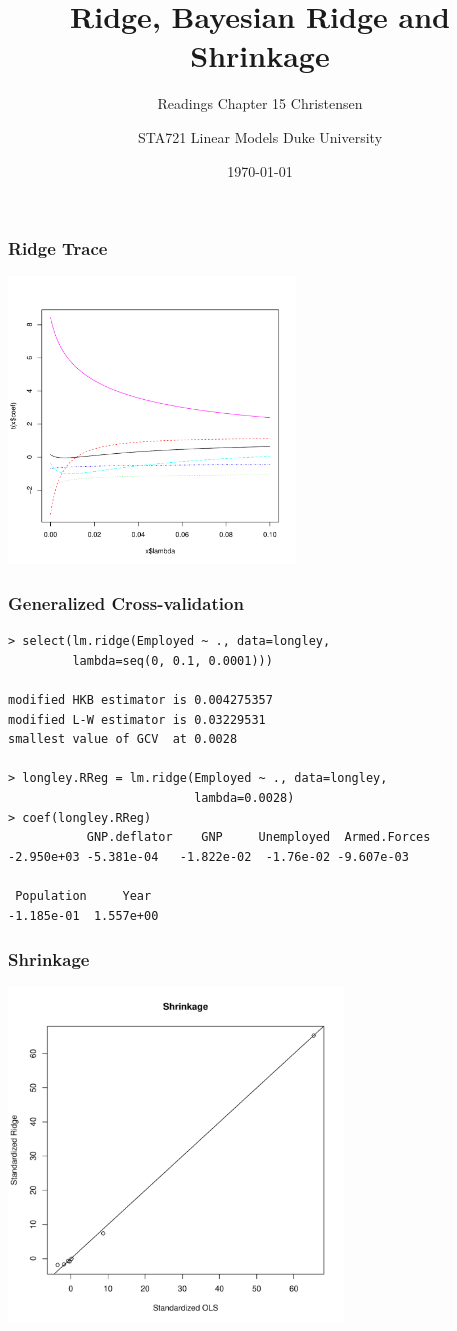 \documentclass[handout]{beamer}
\title{Ridge, Bayesian Ridge and Shrinkage}
\subtitle{Readings Chapter 15 Christensen}
\institute{Merlise Clyde}
\author{STA721 Linear Models Duke University}
\date{\today}
\begin{document}
\maketitle
\begin{frame}
  \frametitle{Ridge Trace}
  \centerline{\includegraphics[height=3in]{ridge-trace}}
\end{frame}
\begin{frame}[fragile]
\frametitle{Generalized Cross-validation}
\begin{small}
\begin{verbatim}
> select(lm.ridge(Employed ~ ., data=longley, 
         lambda=seq(0, 0.1, 0.0001)))

modified HKB estimator is 0.004275357 
modified L-W estimator is 0.03229531 
smallest value of GCV  at 0.0028 

> longley.RReg = lm.ridge(Employed ~ ., data=longley, 
                          lambda=0.0028)
> coef(longley.RReg)
           GNP.deflator    GNP     Unemployed  Armed.Forces 
-2.950e+03 -5.381e-04   -1.822e-02  -1.76e-02 -9.607e-03 

 Population     Year 
-1.185e-01  1.557e+00 
\end{verbatim}
 
\end{small}

\end{frame}
\begin{frame} \frametitle{Shrinkage}
  \includegraphics[height=3.5in]{shrinkage-ridge}
\end{frame}
\end{document}
